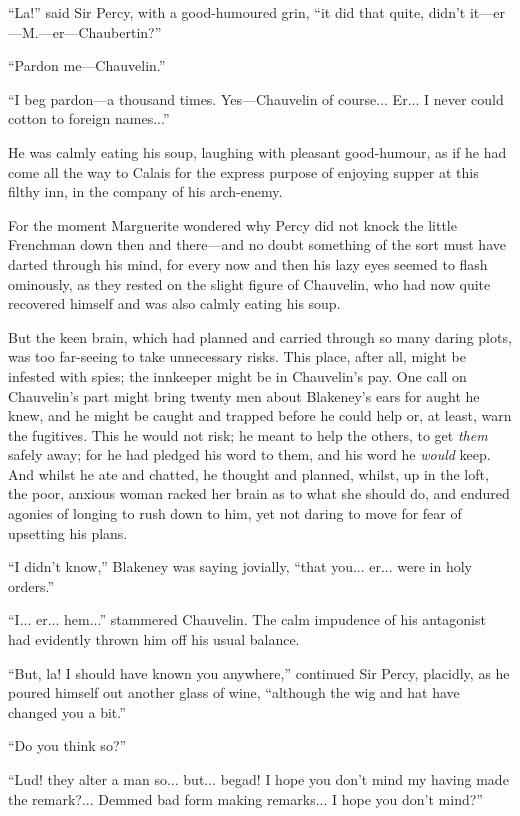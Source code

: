 \documentclass[paper=5.5in:8.5in,BCOR=7mm,twoside,DIV=calc,12pt,usegeometry,chapterprefix,endperiod,headings=big]{scrbook}
\begin{document}
\enquote{La!} said Sir Percy, with a good-humoured grin, \enquote{it did that quite, didn't it---er---M.---er---Chaubertin?}

\enquote{Pardon me---Chauvelin.}

\enquote{I beg pardon---a thousand times. Yes---Chauvelin of course... Er... I never could cotton to foreign names...}

He was calmly eating his soup, laughing with pleasant good-humour, as if he had come all the way to Calais for the express purpose of enjoying supper at this filthy inn, in the company of his arch-enemy.

For the moment Marguerite wondered why Percy did not knock the little Frenchman down then and there---and no doubt something of the sort must have darted through his mind, for every now and then his lazy eyes seemed to flash ominously, as they rested on the slight figure of Chauvelin, who had now quite recovered himself and was also calmly eating his soup.

But the keen brain, which had planned and carried through so many daring plots, was too far-seeing to take unnecessary risks. This place, after all, might be infested with spies; the innkeeper might be in Chauvelin's pay. One call on Chauvelin's part might bring twenty men about Blakeney's ears for aught he knew, and he might be caught and trapped before he could help or, at least, warn the fugitives. This he would not risk; he meant to help the others, to get \textit{them} safely away; for he had pledged his word to them, and his word he \textit{would} keep. And whilst he ate and chatted, he thought and planned, whilst, up in the loft, the poor, anxious woman racked her brain as to what she should do, and endured agonies of longing to rush down to him, yet not daring to move for fear of upsetting his plans.

\enquote{I didn't know,} Blakeney was saying jovially, \enquote{that you... er... were in holy orders.}

\enquote{I... er... hem...} stammered Chauvelin. The calm impudence of his antagonist had evidently thrown him off his usual balance.

\enquote{But, la! I should have known you anywhere,} continued Sir Percy, placidly, as he poured himself out another glass of wine, \enquote{although the wig and hat have changed you a bit.}

\enquote{Do you think so?}

\enquote{Lud! they alter a man so... but... begad! I hope you don't mind my having made the remark?... Demmed bad form making remarks... I hope you don't mind?}
\end{document}
